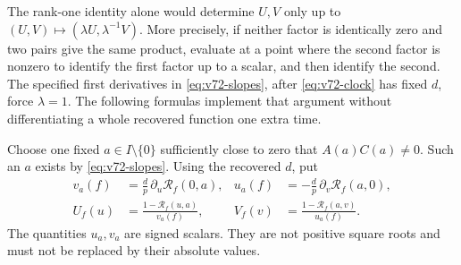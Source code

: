 The rank-one identity alone would determine $U,V$ only up to
$(U,V)\mapsto(\lambda U,\lambda^{-1}V)$.  More precisely, if neither
factor is identically zero and two pairs give the same product, evaluate
at a point where the second factor is nonzero to identify the first
factor up to a scalar, and then identify the second.  The specified first
derivatives in \eqref{eq:v72-slopes}, after \eqref{eq:v72-clock} has
fixed $d$, force $\lambda=1$.  The following formulas implement that
argument without differentiating a whole recovered function one extra
time.

Choose one fixed $a\in I\setminus\{0\}$ sufficiently close to zero
that $A(a)C(a)\ne0$.  Such an $a$ exists by \eqref{eq:v72-slopes}.
Using the recovered $d$, put
\begin{align}
 v_a(f)&=\frac d p\,\partial_u\mathcal R_f(0,a),&
 u_a(f)&=-\frac d p\,\partial_v\mathcal R_f(a,0),
                      \label{eq:v72-anchors}\\
 U_f(u)&=\frac{1-\mathcal R_f(u,a)}{v_a(f)},&
 V_f(v)&=\frac{1-\mathcal R_f(a,v)}{u_a(f)}.
                      \label{eq:v72-factors}
\end{align}
The quantities $u_a,v_a$ are signed scalars.  They are not positive
square roots and must not be replaced by their absolute values.

